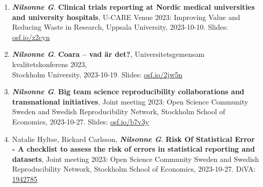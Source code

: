 \documentclass[10pt]{article}
\begin{document}
\begin{enumerate}[nolistsep]
\item \textbf{\textit{Nilsonne G}}. \textbf{Clinical trials reporting at Nordic medical universities and university hospitals}, U-CARE Venue 2023: Improving Value and Reducing Waste in Research, Uppsala University, 2023-10-10. Slides: \href{https://osf.io/z2cyn}{osf.io/z2cyn}
\item \textbf{\textit{Nilsonne G}}. \textbf{Coara – vad är det?}, Universitetsgemensam kvalitetskonferens 2023, \\Stockholm University, 2023-10-19. Slides: \href{https://osf.io/2jw5n}{osf.io/2jw5n}
\item \textbf{\textit{Nilsonne G}}. \textbf{Big team science reproducibility collaborations and transnational initiatives}, Joint meeting 2023: Open Science Community Sweden and Swedish Reproducibility Network, Stockholm School of Economics, 2023-10-27. Slides: \href{https://osf.io/b7v3y}{osf.io/b7v3y}
\item Natalie Hyltse, Rickard Carlsson, \textbf{\textit{Nilsonne G}}. \textbf{Risk Of Statistical Error - A checklist to assess the risk of errors in statistical reporting and datasets}, Joint meeting 2023: Open Science Community Sweden and Swedish Reproducibility Network, Stockholm School of Economics, 2023-10-27. DiVA: \href{https://lnu.diva-portal.org/smash/record.jsf?pid=diva2\%3A1942785}{1942785}

\end{enumerate}
\end{document}

